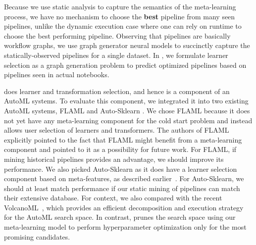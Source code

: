 Because we use static analysis to capture the semantics of the meta-learning process, we have no mechanism to choose the \textbf{best} pipeline from many seen pipelines, unlike the dynamic execution case where one can rely on runtime to choose the best performing pipeline.  Observing that pipelines are basically workflow graphs, we use graph generator neural models to succinctly capture the statically-observed pipelines for a single dataset. In {\sysname}, we formulate learner selection as a graph generation problem to predict optimized pipelines based on pipelines seen in actual notebooks.

 
{\sysname} does learner and transformation selection, and hence is a component of an AutoML systems. To evaluate this component, we integrated it into two existing AutoML systems, FLAML \cite{flaml} and Auto-Sklearn \cite{autosklearn}.  
We chose FLAML because it does not yet have any meta-learning component for the cold start problem and instead allows user selection of learners and transformers. The authors of FLAML explicitly pointed to the fact that FLAML might benefit from a meta-learning component and pointed to it as a possibility for future work. For FLAML, if mining historical pipelines provides an advantage, we should improve its performance. We also picked Auto-Sklearn as it does have a learner selection component based on meta-features, as described earlier~\cite{autosklearn2}. For Auto-Sklearn, we should at least match performance if our static mining of pipelines can match their extensive database. For context, we also compared {\sysname} with the recent VolcanoML~\cite{VolcanoML}, which provides an efficient decomposition and execution strategy for the AutoML search space. In contrast, {\sysname} prunes the search space using our meta-learning model to perform hyperparameter optimization only for the most promising candidates. 


